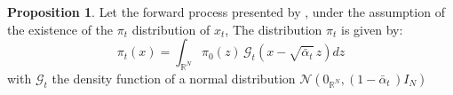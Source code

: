 \documentclass[a4paper,10pt]{article}
\theoremstyle{definition} %
\theoremstyle{definition} %
\newtheorem{proposition}[definition]{Proposition}
\theoremstyle{definition} %
\theoremstyle{definition} %
\newcommand{\R}{\mathbb{R}}
\newcommand{\0}{\boldsymbol{0}}
\begin{document}
\begin{proposition}\label{prop:distribution_a_etap_t}
    Let the forward process presented by , under the assumption of the existence of the $\pi_t$ distribution of $x_t$, The distribution $\pi_t$ is given by:    
    \begin{equation}\label{eq:distribution_pi_t}
        \pi_t(x) = \int_{\R^N} \pi_0(z)\, \mathcal{G}_t(x - \sqrt{\bar \alpha_t}\,z) dz
    \end{equation}
    with $\mathcal{G}_t$ the density function of a normal distribution $\mathcal{N}\left(0_{\R^N}, (1- \bar\alpha _t \,)I_N\right)$
\end{proposition}
\end{document}
